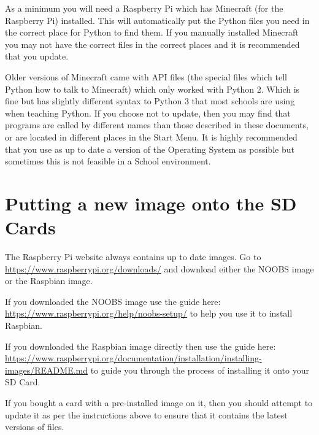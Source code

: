 \documentclass{geocraft-worksheet-multipage}
\begin{document}
As a minimum you will need a Raspberry Pi which has Minecraft (for the
Raspberry Pi) installed. This will automatically put the Python files
you need in the correct place for Python to find them. If you manually
installed Minecraft you may not have the correct files in the correct
places and it is recommended that you update.

Older versions of Minecraft came with API files (the special
files which tell Python how to talk to Minecraft) which only worked
with Python 2. Which is fine but has slightly different syntax to
Python 3 that most schools are using when teaching Python.
If you choose not to update, then you may find that programs are called
by different names than those described in these documents, or are
located in different places in the Start Menu. It is highly
recommended that you use as up to date a version of the Operating
System as possible but sometimes this is not feasible in a School
environment. 

\section*{Putting a new image onto the SD Cards}
The Raspberry Pi website always contains up to date images. Go to
{\textcolor{greenish} {\url{https://www.raspberrypi.org/downloads/}}} and download either the
NOOBS image or the Raspbian image. \vspace{0.5cm}

If you downloaded the NOOBS image use the guide here:
{\textcolor{greenish} {\url{https://www.raspberrypi.org/help/noobs-setup/}}} to help you use it
to install Raspbian. \vspace{0.5cm}

If you downloaded the Raspbian image directly then use the guide here:
{\textcolor{greenish} {\url{https://www.raspberrypi.org/documentation/installation/installing-images/README.md}}}
to guide you through the process of installing it onto your SD Card. \vspace{0.5cm}

If you bought a card with a pre-installed image on it, then you should
attempt to update it as per the instructions above to ensure that it
contains the latest versions of files.
\end{document}
